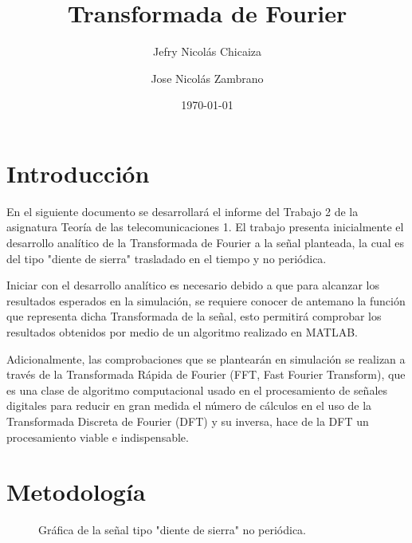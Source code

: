 \documentclass[11pt,a4paper,twocolumn]{article}
\date{\today}
\title{
    \fontsize{26}{26}\selectfont 
    \textbf{Transformada de Fourier}}
\author[1]{Jefry Nicolás Chicaiza}
\author[2]{Jose Nicolás Zambrano}
\affil[1]{jefryn@unicauca.edu.co}
\affil[2]{jnzambranob@unicauca.edu.co}
\date{}
\begin{document}
\maketitle
\thispagestyle{fancy}
\section{Introducción}
    En el siguiente documento se desarrollará el informe del Trabajo 2 de la asignatura 
    Teoría de las telecomunicaciones 1. El trabajo presenta inicialmente el desarrollo 
    analítico de la Transformada de Fourier a la señal planteada, la cual es del tipo 
    "diente de sierra"  trasladado en el tiempo y no periódica.
    
    Iniciar con el desarrollo analítico es necesario debido a que para alcanzar los 
    resultados esperados en la simulación, se requiere conocer de antemano la función que 
    representa dicha Transformada de la señal, esto permitirá comprobar los resultados 
    obtenidos por medio de un algoritmo realizado en MATLAB.\cite{silviaRB}
    
    Adicionalmente, las comprobaciones que se plantearán en simulación se realizan a través 
    de la Transformada Rápida de Fourier (FFT, Fast Fourier Transform), que es una clase de 
    algoritmo computacional usado en el procesamiento de señales digitales para reducir en gran 
    medida el número de cálculos en el uso de la Transformada Discreta de Fourier (DFT) y su 
    inversa, hace de la DFT un procesamiento viable e indispensable.\cite{Poularikas2007}

       
\section{Metodología}
    

    \begin{figure}[H]
        \centering
        \caption{Gráfica de la señal tipo "diente de sierra" no periódica.}
        \label{funcionAsiganda}
    \end{figure}
\end{document}
